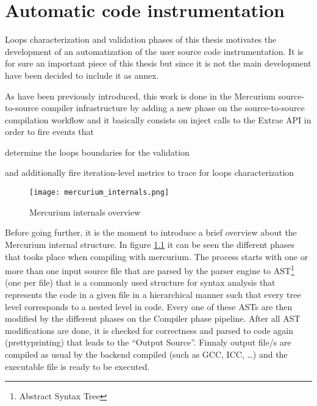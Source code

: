 \chapter{Automatic code instrumentation}\label{ann:automatic_code_instr}

Loops characterization and validation phases of this thesis motivates the development
of an automatization of the user source code instrumentation. It is for sure an
important piece of this thesis but since it is not the main development have been
decided to include it as annex.

As have been previously introduced, this work is done in the Mercurium 
source-to-source compiler infrastructure by adding a new phase on the 
source-to-source compilation workflow and it basically consists on inject 
calls to the Extrae API in order to fire events that
\begin{enumerate*}[label=\roman*)]
    \item determine the loops boundaries for the validation
    \item and additionally fire iteration-level metrics to trace for loops characterization
\end{enumerate*}

\begin{figure}
  \centering
  \texttt{[image: mercurium\_internals.png]}
  \caption{Mercurium internals overview}
  \label{fig:mercurium_internals_overview}
\end{figure}

Before going further, it is the moment to introduce a brief overview about the
Mercurium internal structure. In figure \ref{fig:mercurium_internals_overview} 
it can be seen the different phases that tooks place when compiling with
mercurium. The process starts with one or more than one input source file that
are parsed by the parser engine to AST\footnote{Abstract Syntax Tree} (one per
file) that is a commonly used structure for syntax analysis that represents the 
code in a given file in a hierarchical manner such that every tree level
corresponds to a nested level in code. Every one of these ASTs are then modified
by the different phases on the Compiler phase pipeline. 
After all AST modifications are done, it is checked for
correctness and parsed to code again (prettyprinting) that leads to the ``Output
Source''. Finnaly output file/s are compiled as usual by the backend compiled
(such as GCC, ICC, \ldots) and the executable file is ready to be executed.

